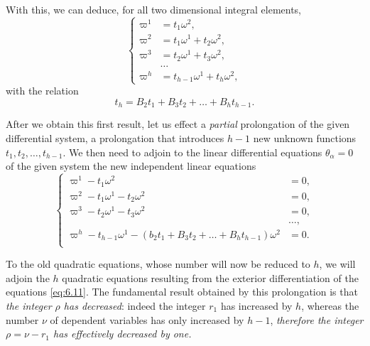 With this, we can deduce, for all two dimensional integral elements,
\begin{equation}
  \label{eq:6.9}
  \left\{
    \begin{aligned}
      \varpi^{1}&=t_{1}\omega^{2},\\
      \varpi^{2}&=t_{1}\omega^{1}+t_{2}\omega^{2},\\
      \varpi^{3}&=t_{2}\omega^{1}+t_{3}\omega^{2},\\
      &\dots\\
      \varpi^{h}&=t_{h-1}\omega^{1}+t_{h}\omega^{2},
    \end{aligned}
  \right.
\end{equation}
with the relation
\begin{equation}
  \label{eq:6.10}
  t_{h}=B_{2}t_{1}+B_{3}t_{2}+\dots+B_{h}t_{h-1}.
\end{equation}


\vspace{12pt}\fsec After we obtain this first result, let us effect a \emph{partial} prolongation of the given differential system, a prolongation that introduces $h-1$ new unknown functions $t_{1},t_{2},\dots,t_{h-1}$. We then need to adjoin to the linear differential equations $\theta_{\alpha}=0$ of the given system the new independent linear equations
\begin{equation}
  \label{eq:6.11}
  \left\{
    \begin{aligned}
      \varpi^{1}-t_{1}\omega^{2}&=0,\\
      \varpi^{2}-t_{1}\omega^{1}-t_{2}\omega^{2}&=0,\\
      \varpi^{3}-t_{2}\omega^{1}-t_{3}\omega^{2}&=0,\\
      &\dots,\\
      \varpi^{h}-t_{h-1}\omega^{1}-(b_{2}t_{1}+B_{3}t_{2}+\dots+B_{h}t_{h-1})\omega^{2}&=0.\\
    \end{aligned}
  \right.
\end{equation}

To the old quadratic equations, whose number will now be reduced to $h$, we will adjoin the $h$ quadratic equations resulting from the exterior differentiation of the equations \eqref{eq:6.11}. The fundamental result obtained by this prolongation is that \emph{the integer $\rho$ has decreased}: indeed the integer $r_{1}$ has increased by $h$, whereas the number $\nu$ of dependent variables has only increased by $h-1$, \emph{therefore the integer $\rho=\nu-r_{1}$ has effectively decreased by one.}

